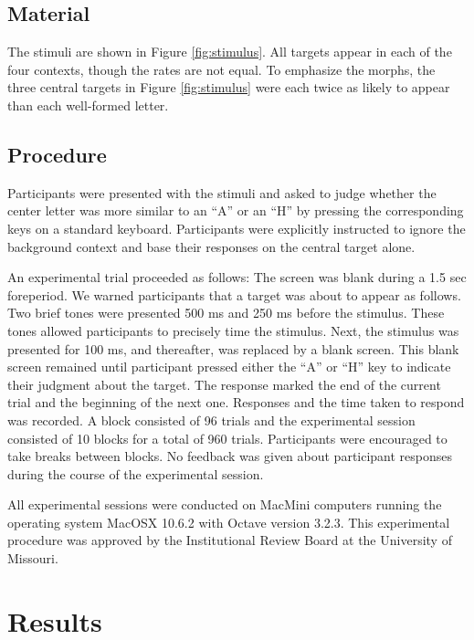 \documentclass[english,floatsintext,man]{apa6}
\theoremstyle{definition}
\theoremstyle{definition}
\theoremstyle{remark}
\begin{document}
\subsection{Material}\label{material}

The stimuli are shown in Figure \ref{fig:stimulus}. All targets appear
in each of the four contexts, though the rates are not equal. To
emphasize the morphs, the three central targets in Figure
\ref{fig:stimulus} were each twice as likely to appear than each
well-formed letter.

\subsection{Procedure}\label{procedure}

Participants were presented with the stimuli and asked to judge whether
the center letter was more similar to an \enquote{A} or an \enquote{H}
by pressing the corresponding keys on a standard keyboard. Participants
were explicitly instructed to ignore the background context and base
their responses on the central target alone.

An experimental trial proceeded as follows: The screen was blank during
a 1.5 sec foreperiod. We warned participants that a target was about to
appear as follows. Two brief tones were presented 500 ms and 250 ms
before the stimulus. These tones allowed participants to precisely time
the stimulus. Next, the stimulus was presented for 100 ms, and
thereafter, was replaced by a blank screen. This blank screen remained
until participant pressed either the \enquote{A} or \enquote{H} key to
indicate their judgment about the target. The response marked the end of
the current trial and the beginning of the next one. Responses and the
time taken to respond was recorded. A block consisted of 96 trials and
the experimental session consisted of 10 blocks for a total of 960
trials. Participants were encouraged to take breaks between blocks. No
feedback was given about participant responses during the course of the
experimental session.

All experimental sessions were conducted on MacMini computers running
the operating system MacOSX 10.6.2 with Octave version 3.2.3. This
experimental procedure was approved by the Institutional Review Board at
the University of Missouri.

\section{Results}\label{results}
\end{document}
